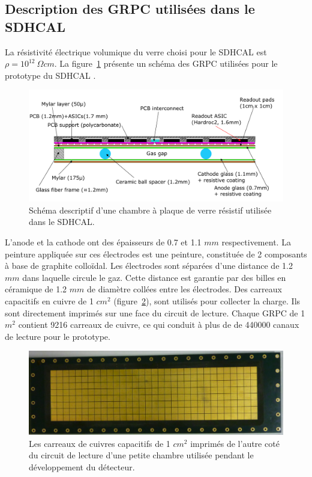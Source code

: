 \subsection{Description des GRPC utilisées dans le SDHCAL}
La résistivité électrique volumique du verre choisi pour le SDHCAL est $\rho=10^{12}~\Omega cm$. La figure~\ref{fig:grpc} présente un schéma des GRPC utilisées pour le prototype du SDHCAL \cite{kieffer}. 
\begin{figure}[!ht]
  \begin{center}
    \includegraphics[width=.8\textwidth]{SDHCAL/figs/GRPC-K7.png}
    \caption{Schéma descriptif d'une chambre à plaque de verre résistif utilisée dans le SDHCAL.}
    \label{fig:grpc}
  \end{center}
\end{figure}
L'anode et la cathode ont des épaisseurs de 0.7 et 1.1 $mm$ respectivement. La peinture appliquée sur ces électrodes est une peinture, constituée de 2 composants à base de graphite colloïdal. Les électrodes sont séparées d'une distance de 1.2 $mm$ dans laquelle circule le gaz. Cette distance est garantie par des billes en céramique de 1.2 $mm$ de diamètre collées entre les électrodes. Des carreaux capacitifs en cuivre de 1 $cm^2$ (figure~\ref{fig:carreaux}), sont utilisés pour collecter la charge. Ils sont directement imprimés sur une face du circuit de lecture. Chaque GRPC de 1 $m^2$ contient 9216 carreaux de cuivre, ce qui conduit à plus de de 440000 canaux de lecture pour le prototype.
\begin{figure}[!ht]
  \begin{center}
    \includegraphics[width=.8\textwidth]{SDHCAL/figs/PADs.png}
    \caption{Les carreaux de cuivres capacitifs de 1 $cm^2$ imprimés de l'autre coté du circuit de lecture d'une petite chambre utilisée pendant le développement du détecteur.}
    \label{fig:carreaux}
  \end{center}
\end{figure}
